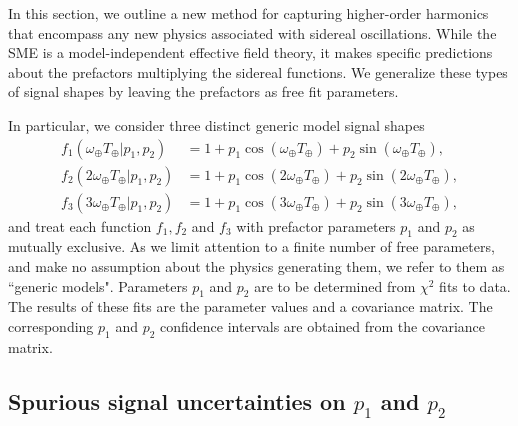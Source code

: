 In this section, we outline a new method for capturing
higher-order harmonics that encompass 
any new physics associated with sidereal oscillations. 
While the SME is a model-independent effective field theory, it makes
specific predictions about the prefactors multiplying the 
sidereal functions. We generalize these types of signal shapes
by leaving the prefactors as free fit parameters. 

In particular, we consider three distinct generic 
model signal shapes 
%
\begin{subequations}
\label{eq:generic_shapes}
\begin{align}
    f_{1}(\omega_\oplus T_\oplus| p_{1}, p_{2}) 
    &= 1+ p_{1}
    \cos(\omega_\oplus T_\oplus) 
    + p_{2}\sin(\omega_\oplus T_\oplus), \label{eq:generic_shape1} \\
    f_{2}(2\omega_\oplus T_\oplus| p_{1}, p_{2}) 
    &= 1+ p_{1}\cos(2\omega_\oplus T_\oplus) 
    + p_{2}\sin(2\omega_\oplus T_\oplus), \label{eq:generic_shape2} \\
    f_{3}(3\omega_\oplus T_\oplus| p_{1}, p_{2}) 
    &= 1+ p_{1}\cos(3\omega_\oplus T_\oplus) 
    + p_{2}\sin(3\omega_\oplus T_\oplus), \label{eq:generic_shape3}
\end{align}
\end{subequations}
%
and treat each function $f_1, f_2$ and $f_3$ with prefactor parameters
$p_1$ and $p_2$ as mutually exclusive. As we limit
attention to a finite number of free parameters, and make no assumption 
about the physics generating them, we refer to them as ``generic models". 
Parameters $p_1$ and $p_2$ are to be determined from $\chi^{2}$
fits to data. The results of these fits are the parameter values and a covariance matrix.
The corresponding $p_1$ and $p_2$ confidence intervals are obtained
from the covariance matrix.



\subsection{Spurious signal uncertainties on $p_{1}$ and $p_{2}$}

